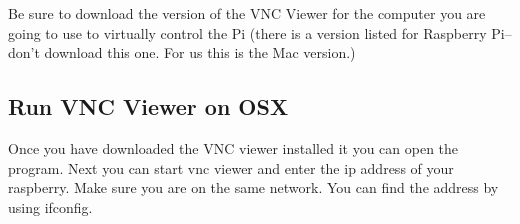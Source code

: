 Be sure to download the version of the VNC Viewer for the computer you
are going to use to virtually control the Pi (there is a version listed
for Raspberry Pi-- don't download this one. For us this is the Mac
version.)

\subsection{Run VNC Viewer on OSX}\label{run-vnc-viewer-on-osx}

Once you have downloaded the VNC viewer installed it you can open the
program. Next you can start vnc viewer and enter the ip address of your
raspberry. Make sure you are on the same network. You can find the
address by using ifconfig.
